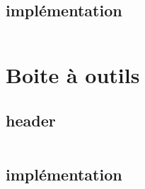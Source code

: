 \documentclass{article}
\begin{document}
\subsection{implémentation}
\inputminted{cpp}{maillage.cpp}

\section{Boite à outils}

\subsection{header}
\inputminted{cpp}{boite_a_outils.h}

\subsection{implémentation}
\inputminted{cpp}{boite_a_outils.cpp}
\end{document}
